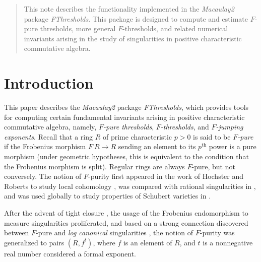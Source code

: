 \documentclass{amsart}
\begin{document}
\begin{abstract}
   This note describes the functionality implemented in the \emph{Macaulay2} package \emph{FThresholds}.
   This package is designed to compute and estimate $F$-pure thresholds, more general $F$-thresholds, and related numerical invariants arising in the study of singularities in positive characteristic commutative algebra.
\end{abstract}




\maketitle

\section{Introduction}

This paper describes the \emph{Macaulay2} \cite{M2} package \emph{FThresholds}, which provides tools for computing certain fundamental invariants arising in positive characteristic commutative algebra, namely, \emph{$F$-pure thresholds}, \emph{$F$-thresholds}, and \emph{$F$-jumping exponents}.
Recall that a ring $R$ of prime characteristic $p>0$ is said to be \emph{$F$-pure} if the Frobenius morphism $F \: R \to R$ sending an element to its $p^\text{th}$ power is a pure morphism (under geometric hypotheses, this is equivalent to the condition that the Frobenius morphism is split).  Regular rings are always $F$-pure, but not conversely.
The notion of $F$-purity first appeared in the work \cite{HochsterRobertsFrobeniusLocalCohomology}  of Hochster and Roberts to study local cohomology \cite{HochsterRobertsFrobeniusLocalCohomology}, was compared with rational singularities in  \cite{FedderFPureRat}, and was used globally to study properties of Schubert varieties in \cite{MehtaRamanathanFrobeniusSplittingAndCohomologyVanishing}.

After the advent of tight closure \cite{HochsterHunekeTC1}, the usage of the Frobenius endomorphism to measure singularities proliferated, and based on a strong connection discovered between $F$-pure and \emph{log canonical} singularities \cite{HaraWatanabeFRegFPure}, the notion of $F$-purity was generalized to pairs $(R, f^t)$, where $f$ is an element of $R$, and $t$ is a nonnegative real number considered a formal exponent.
\end{document}
